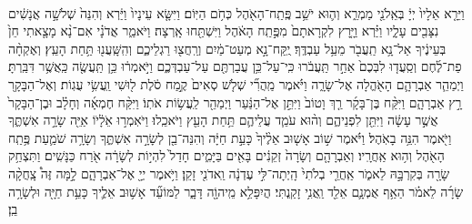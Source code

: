 \documentclass[twoside, openany, parskip=half, 11pt]{book}
\begin{document}
\begin{footnotesize}
\begin{multicols}{2}
\\
 וַיֵּרָ֤א אֵלָיו֙ יְיָ֔ בְּאֵֽלֹנֵ֖י מַמְרֵ֑א וְה֛וּא יֹשֵׁ֥ב פֶּֽתַֽח־הָאֹ֖הֶל כְּחֹ֥ם הַיּֽוֹם׃ וַיִּשָּׂ֤א עֵינָיו֙ וַיַּ֔רְא וְהִנֵּה֙ שְׁלֹשָׁ֣ה אֲנָשִׁ֔ים נִצָּבִ֖ים עָלָ֑יו וַיַּ֗רְא וַיָּ֤רָץ לִקְרָאתָם֙ מִפֶּ֣תַֽח הָאֹ֔הֶל וַיִּשְׁתַּ֖חוּ אָֽרְצָה׃ וַיֹּאמַ֑ר אֲדֹנָ֗י אִם־נָ֨א מָצָ֤אתִי חֵן֙ בְּעֵינֶ֔יךָ אַל־נָ֥א תַֽעֲבֹ֖ר מֵעַ֥ל עַבְדֶּֽךָ׃ 
 יֻֽקַּח־נָ֣א מְעַט־מַ֔יִם וְרַֽחֲצ֖וּ רַגְלֵיכֶ֑ם וְהִֽשָּֽׁעֲנ֖וּ תַּ֥חַת הָעֵֽץ׃ וְאֶקְחָ֨ה פַת־לֶ֜חֶם וְסַֽעֲד֤וּ לִבְּכֶם֙ אַחַ֣ר תַּֽעֲבֹ֔רוּ כִּֽי־עַל־כֵּ֥ן עֲבַרְתֶּ֖ם עַל־עַבְדְּכֶ֑ם וַיֹּ֣אמְר֔וּ כֵּ֥ן תַּֽעֲשֶׂ֖ה כַּֽאֲשֶׁ֥ר דִּבַּֽרְתָּ׃
 וַיְמַהֵ֧ר אַבְרָהָ֛ם הָאֹ֖הֱלָה אֶל־שָׂרָ֑ה וַיֹּ֗אמֶר מַֽהֲרִ֞י שְׁלֹ֤שׁ סְאִים֙ קֶ֣מַח סֹ֔לֶת ל֖וּשִׁי וַֽעֲשִׂ֥י עֻגֽוֹת׃ וְאֶל־הַבָּקָ֖ר רָ֣ץ אַבְרָהָ֑ם וַיִּקַּ֨ח בֶּן־בָּקָ֜ר רַ֤ךְ וָטוֹב֙ וַיִּתֵּ֣ן אֶל־הַנַּ֔עַר וַיְמַהֵ֖ר לַֽעֲשׂ֥וֹת אֹתֽוֹ׃ וַיִּקַּ֨ח חֶמְאָ֜ה וְחָלָ֗ב וּבֶן־הַבָּקָר֙ אֲשֶׁ֣ר עָשָׂ֔ה וַיִּתֵּ֖ן לִפְנֵיהֶ֑ם וְה֨וּא עֹמֵ֧ד עֲלֵיהֶ֛ם תַּ֥חַת הָעֵ֖ץ וַיֹּאכֵֽלוּ׃  וַיֹּאֽמְר֣וּ אֵֹלָ֔יֹוֹ אַיֵּ֖ה שָׂרָ֣ה אִשְׁתֶּ֑ךָ וַיֹּ֖אמֶר הִנֵּ֥ה בָאֹֽהֶל׃ וַיֹּ֗אמֶר שׁ֣וֹב אָשׁ֤וּב אֵלֶ֨יךָ֙ כָּעֵ֣ת חַיָּ֔ה וְהִנֵּה־בֵ֖ן לְשָׂרָ֣ה אִשְׁתֶּ֑ךָ וְשָׂרָ֥ה שֹׁמַ֛עַת פֶּ֥תַֽח הָאֹ֖הֶל וְה֥וּא אַֽחֲרָֽיו׃ וְאַבְרָהָ֤ם וְשָׂרָה֙ זְקֵנִ֔ים בָּאִ֖ים בַּיָּמִ֑ים חָדַל֙ לִהְי֣וֹת לְשָׂרָ֔ה אֹ֖רַח כַּנָּשִֽׁים׃ וַתִּצְחַ֥ק שָׂרָ֖ה בְּקִרְבָּ֣הּ לֵאמֹ֑ר אַֽחֲרֵ֤י בְלֹתִי֙ הָֽיְתָה־לִּ֣י עֶדְנָ֔ה וַֽאדֹנִ֖י זָקֵֽן׃ וַיֹּ֥אמֶר יְיָ֖ אֶל־אַבְרָהָ֑ם לָ֣מָּה זֶּה֩ צָֽחֲקָ֨ה שָׂרָ֜ה לֵאמֹ֗ר הַאַ֥ף אֻמְנָ֛ם אֵלֵ֖ד וַֽאֲנִ֥י זָקַֽנְתִּי׃ הֲיִפָּלֵ֥א מֵֽיהוָֹ֖ה דָּבָ֑ר לַמּוֹעֵ֞ד אָשׁ֥וּב אֵלֶ֛יךָ כָּעֵ֥ת חַיָּ֖ה וּלְשָׂרָ֥ה בֵֽן׃


\end{multicols}
\end{footnotesize}
\end{document}
